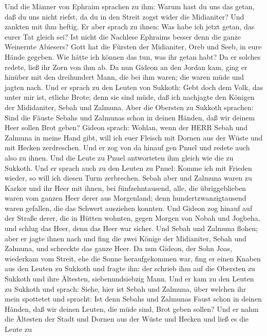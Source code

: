  Und die Männer von Ephraim sprachen zu ihm: Warum hast du
uns das getan, daß du uns nicht riefst, da du in den Streit zogst wider
die Midianiter? Und zankten mit ihm heftig.  Er aber sprach
zu ihnen: Was habe ich jetzt getan, das eurer Tat gleich sei? Ist nicht
die Nachlese Ephraims besser denn die ganze Weinernte Abiesers?
 Gott hat die Fürsten der Midianiter, Oreb und Seeb, in eure
Hände gegeben. Wie hätte ich können das tun, was ihr getan habt? Da er
solches redete, ließ ihr Zorn von ihm ab.  Da nun Gideon an
den Jordan kam, ging er hinüber mit den dreihundert Mann, die bei ihm
waren; die waren müde und jagten nach.  Und er sprach zu den
Leuten von Sukkoth: Gebt doch dem Volk, das unter mir ist, etliche
Brote; denn sie sind müde, daß ich nachjagte den Königen der
Mididaniter, Sebah und Zalmuna.  Aber die Obersten zu
Sukkoth sprachen: Sind die Fäuste Sebahs und Zalmunas schon in deinen
Händen, daß wir deinem Heer sollen Brot geben?  Gideon
sprach: Wohlan, wenn der HERR Sebah und Zalmuna in meine Hand gibt, will
ich euer Fleisch mit Dornen aus der Wüste und mit Hecken zerdreschen.
 Und er zog von da hinauf gen Pnuel und redete auch also zu
ihnen. Und die Leute zu Pnuel antworteten ihm gleich wie die zu Sukkoth.
 Und er sprach auch zu den Leuten zu Pnuel: Komme ich mit
Frieden wieder, so will ich diesen Turm zerbrechen.  Sebah
aber und Zalmuna waren zu Karkor und ihr Heer mit ihnen, bei
fünfzehntausend, alle, die übriggeblieben waren vom ganzen Heer derer
aus Morgenland; denn hundertzwanzigtausend waren gefallen, die das
Schwert ausziehen konnten.  Und Gideon zog hinauf auf der
Straße derer, die in Hütten wohnten, gegen Morgen von Nobah und Jogbeha,
und schlug das Heer, denn das Heer war sicher.  Und Sebah
und Zalmuna flohen; aber er jagte ihnen nach und fing die zwei Könige
der Midianiter, Sebah und Zalmuna, und schreckte das ganze Heer.
 Da nun Gideon, der Sohn Joas, wiederkam vom Streit, ehe
die Sonne heraufgekommen war,  fing er einen Knaben aus den
Leuten zu Sukkoth und fragte ihn; der schrieb ihm auf die Obersten zu
Sukkoth und ihre Ältesten, siebenundsiebzig Mann.  Und er
kam zu den Leuten zu Sukkoth und sprach: Siehe, hier ist Sebah und
Zalmuna, über welchen ihr mein spottetet und spracht: Ist denn Sebahs
und Zalmunas Faust schon in deinen Händen, daß wir deinen Leuten, die
müde sind, Brot geben sollen?  Und er nahm die Ältesten der
Stadt und Dornen aus der Wüste und Hecken und ließ es die Leute zu
